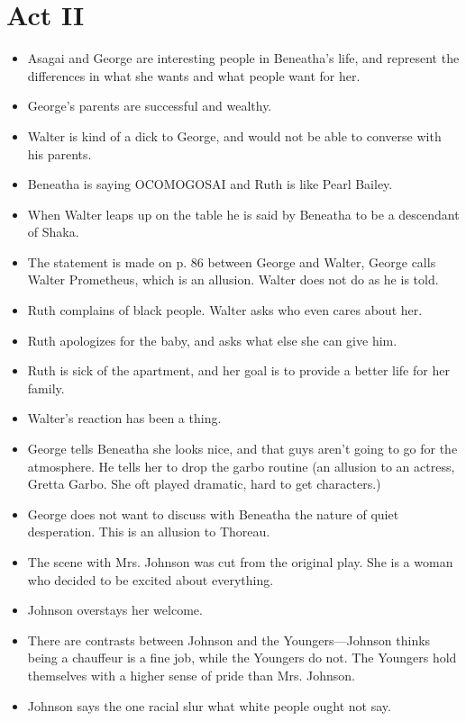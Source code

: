 \documentclass[11pt]{article}
\begin{document}
\section{Act II}
\begin{itemize}
	\item Asagai and George are interesting people in Beneatha's life, and 
		represent the differences in what she wants and what people want for her.
	\item George's parents are successful and wealthy.
	\item Walter is kind of a dick to George, and would not be able to converse
		with his parents.
	\item Beneatha is saying OCOMOGOSAI and Ruth is like Pearl Bailey.
	\item When Walter leaps up on the table he is said by Beneatha to be a
		descendant of Shaka.
	\item The statement is made on p. 86 between George and Walter, George calls
		Walter Prometheus, which is an allusion.  Walter does not do as he is told.
	\item Ruth complains of black people.  Walter asks who even cares about her.
	\item Ruth apologizes for the baby, and asks what else she can give him.
	\item Ruth is sick of the apartment, and her goal is to provide a better life
		for her family.
	\item Walter's reaction has been a thing.
	\item George tells Beneatha she looks nice, and that guys aren't going to go 
		for the atmosphere.  He tells her to drop the garbo routine (an allusion to
		an actress, Gretta Garbo.  She oft played dramatic, hard to get characters.)
	\item George does not want to discuss with Beneatha the nature of quiet
		desperation.  This is an allusion to Thoreau.
	\item The scene with Mrs. Johnson was cut from the original play.  She is a
		woman who decided to be excited about everything.
	\item Johnson overstays her welcome.
	\item There are contrasts between Johnson and the Youngers---Johnson thinks 
		being a chauffeur is a fine job, while the Youngers do not.  The Youngers 
		hold themselves with a higher sense of pride than Mrs. Johnson.
	\item Johnson says the one racial slur what white people ought not say.

\end{itemize}
\end{document}
